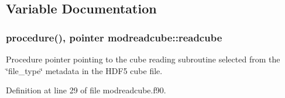 \subsection{Variable Documentation}
\subsubsection[{\texorpdfstring{readcube}{readcube}}]{\setlength{\rightskip}{0pt plus 5cm}procedure(), pointer modreadcube\+::readcube}\hypertarget{namespacemodreadcube_af4018b3e5809ee7ec7974a7601f2b304}{}\label{namespacemodreadcube_af4018b3e5809ee7ec7974a7601f2b304}


Procedure pointer pointing to the cube reading subroutine selected from the \char`\"{}file\+\_\+type\char`\"{} metadata in the H\+D\+F5 cube file. 



Definition at line 29 of file modreadcube.\+f90.

